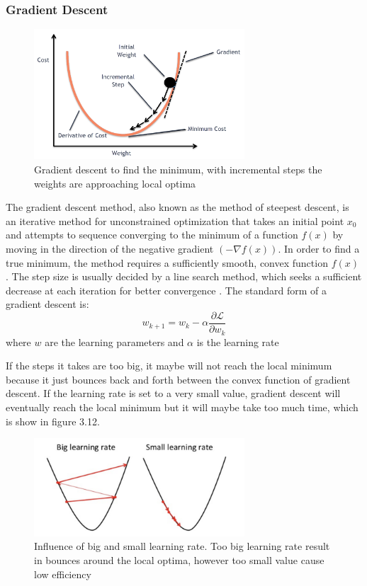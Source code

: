 \subsubsection*{Gradient Descent}
\begin{figure}[h]
	\includegraphics[width=0.7\textwidth]{Figures/Section3_GradientDescent.png} 
	\centering
	\caption{Gradient descent to find the minimum, with incremental steps the weights are approaching local optima}
	\label{fig:gd}
\end{figure}
The gradient descent method, also known as the method of steepest descent, is an iterative method for unconstrained optimization that takes an initial point $x_0$ and attempts to sequence converging to the minimum of a function $f(x)$ by moving in the direction of the negative gradient $(-\nabla f(x))$. In order to find a true minimum, the method requires a sufficiently smooth, convex function $f(x)$ \cite{shewchuk1994introduction}. The step size is usually decided by a line search method, which seeks a sufficient decrease at each iteration for better convergence \cite{more1994line}. The standard form of a gradient descent is:
\begin{equation}
w_{k+1}=w_k-\alpha \frac{\partial \mathcal{L}}{\partial w_k}
\end{equation}
where $w$ are the learning parameters and $\alpha$ is the learning rate

If the steps it takes are too big, it maybe will not reach the local minimum because it just bounces back and forth between the convex function of gradient descent. If the learning rate is set to a very small value, gradient descent will eventually reach the local minimum but it will maybe take too much time, which is show in figure 3.12.
\begin{figure}[h]
	\includegraphics[width=0.7\textwidth]{Figures/Section3_learningrate.png} 
	\centering
	\caption{Influence of big and small learning rate. Too big learning rate result in bounces around the local optima, however too small value cause low efficiency }
	\label{fig:lr}
\end{figure}

